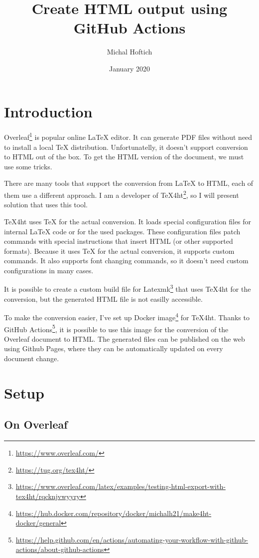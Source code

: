 \documentclass{article}
\title{Create HTML output using GitHub Actions}
\author{Michal Hoftich}
\date{January 2020}
\newcommand\footurl[1]{\footnote{\url{#1}}}
\begin{document}
\maketitle

\section{Introduction}

Overleaf\footurl{https://www.overleaf.com/} is popular online \LaTeX{} editor. It can generate PDF files 
without need to install a local \TeX{} distribution. Unfortunatelly, it doesn't support conversion to HTML out of the box. To get the HTML version of the document, we must use some tricks.

There are many tools that support the conversion from \LaTeX{} to HTML, each of them use a different approach. I am a developer of \TeX4ht\footurl{https://tug.org/tex4ht/}, so I will present solution that uses this tool. 

\TeX4ht uses \TeX{} for the actual conversion. It loads special configuration files for internal \LaTeX{} code or for the used packages. These configuration files patch commands with special instructions that insert HTML (or other supported formats). Because it uses \TeX{} for the actual conversion, it supports custom commands. It also supports font changing commands, so  it doesn't need custom configurations in many cases.

It is possible to create a custom build file for Latexmk\footurl{https://www.overleaf.com/latex/examples/testing-html-export-with-tex4ht/rqcknjvwyyry} 
that uses \TeX4ht for the conversion, but the generated HTML file is not easilly accessible.  

To make the conversion easier, I've set up Docker image\footurl{https://hub.docker.com/repository/docker/michalh21/make4ht-docker/general} for \TeX4ht. 
Thanks to GitHub Actions\footurl{https://help.github.com/en/actions/automating-your-workflow-with-github-actions/about-github-actions}, 
it is possible to use this image for the conversion of the Overleaf document to HTML. 
The generated files can be published on the web using Github Pages, where they can be automatically 
updated on every document change.

\section{Setup}

\subsection{On Overleaf}
\end{document}
